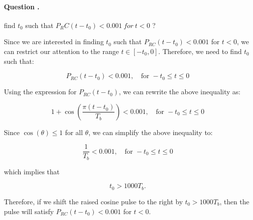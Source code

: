 \documentclass[14pt,a4paper]{report}
\newcounter{question}
\newcommand*\question{%
\stepcounter{question}%
\paragraph{Question \thesection.\thequestion}}
\begin{document}
\question
{
    find $t_0$ such that $P_RC (t - t_0 ) < 0.001\ for\ t < 0$ ?
}
\begin{answer_box*}
    Since we are interested in finding $t_0$ such that $P_{RC}(t-t_0) < 0.001$ for $t<0$, we can restrict our attention to the range $t\in[-t_0,0]$. Therefore, we need to find $t_0$ such that:

\begin{equation}
    P_{RC}(t-t_0) < 0.001, \quad \text{for } -t_0 \leq t \leq 0
\end{equation}

Using the expression for $P_{RC}(t-t_0)$, we can rewrite the above inequality as:

\begin{equation}
    1 + \cos\left(\frac{\pi(t-t_0)}{T_b}\right) < 0.001, \quad \text{for } -t_0 \leq t \leq 0
\end{equation}

Since $\cos(\theta) \leq 1$ for all $\theta$, we can simplify the above inequality to:

\begin{equation}
    \frac{1}{T_b} < 0.001, \quad \text{for } -t_0 \leq t \leq 0
\end{equation}

which implies that

\begin{equation}
    t_0 > 1000T_b.
\end{equation}

Therefore, if we shift the raised cosine pulse to the right by $t_0 > 1000T_b$, then the pulse will satisfy $P_{RC}(t-t_0) < 0.001$ for $t<0$.
\end{answer_box*}
\end{document}
